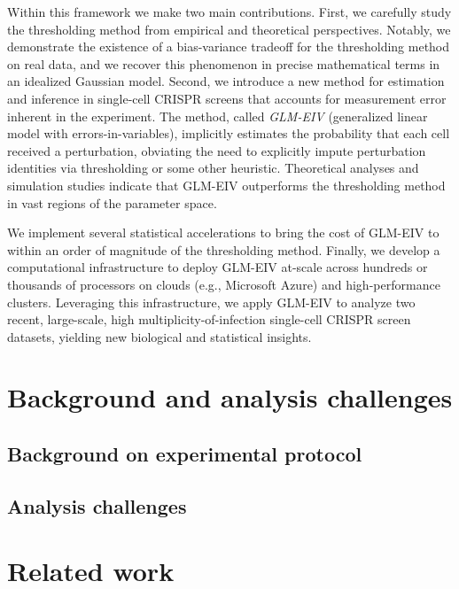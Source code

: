 \documentclass[12pt]{article}
\begin{document}
Within this framework we make two main contributions. First, we carefully study the thresholding method from empirical and theoretical perspectives. Notably, we demonstrate the existence of a bias-variance tradeoff for the thresholding method on real data, and we recover this phenomenon in precise mathematical terms in an idealized Gaussian model. Second, we introduce a new method for estimation and inference in single-cell CRISPR screens that accounts for measurement error inherent in the experiment. The method, called \textit{GLM-EIV} (generalized linear model with errors-in-variables), implicitly estimates the probability that each cell received a perturbation, obviating the need to explicitly impute perturbation identities via thresholding or some other heuristic. Theoretical analyses and simulation studies indicate that GLM-EIV outperforms the thresholding method in vast regions of the parameter space.

We implement several statistical accelerations to bring the cost of GLM-EIV to within an order of magnitude of the thresholding method. Finally, we develop a computational infrastructure to deploy GLM-EIV at-scale across hundreds or thousands of processors on clouds (e.g., Microsoft Azure) and high-performance clusters. Leveraging this infrastructure, we apply GLM-EIV to analyze two recent, large-scale, high multiplicity-of-infection single-cell CRISPR screen datasets, yielding new biological and statistical insights. 


\section{Background and analysis challenges}

\subsection{Background on experimental protocol}

\subsection{Analysis challenges}

\section{Related work}
\end{document}
